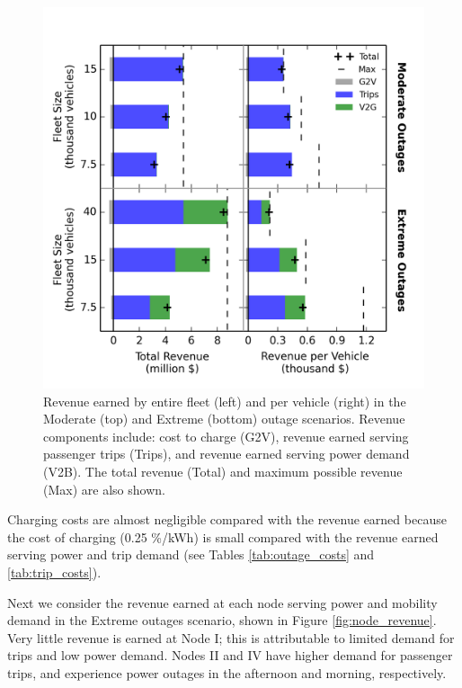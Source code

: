 \documentclass[journal]{IEEEtran}
\begin{document}
\begin{figure}[!htbp]
  \includegraphics[width=\linewidth]{plots/full_revenue_barchart.png}
  \caption{Revenue earned by entire fleet (left) and per vehicle (right) in the Moderate (top) and Extreme (bottom) outage scenarios. Revenue components include: cost to charge (G2V), revenue earned serving passenger trips (Trips), and revenue earned serving power demand (V2B). The total revenue (Total) and maximum possible revenue (Max) are also shown.}
  \label{fig:revenue_bar}
\end{figure}

Charging costs are almost negligible compared with the revenue earned because the cost of charging (0.25 \%/kWh) is small compared with the revenue earned serving power and trip demand (see Tables \ref{tab:outage_costs} and \ref{tab:trip_costs}).

Next we consider the revenue earned at each node serving power and mobility demand in the Extreme outages scenario, shown in Figure \ref{fig:node_revenue}. Very little revenue is earned at Node I; this is attributable to limited demand for trips and low power demand. Nodes II and IV have higher demand for passenger trips, and experience power outages in the afternoon and morning, respectively.
\end{document}
